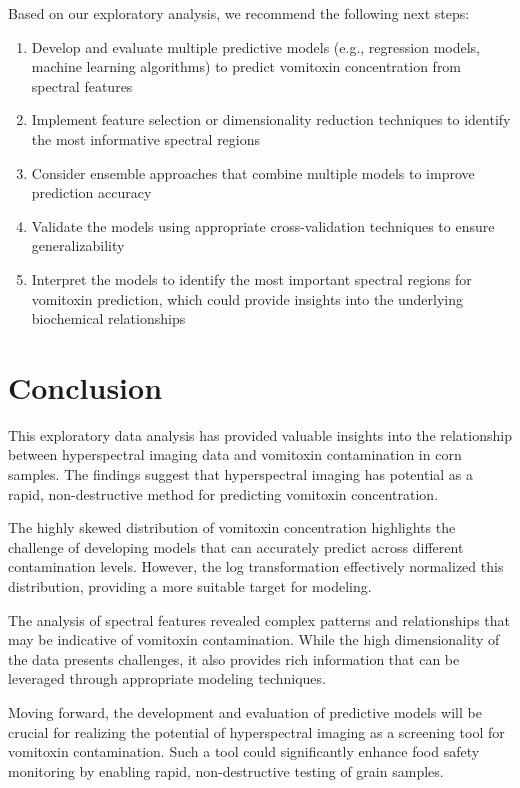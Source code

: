 \documentclass[12pt,a4paper]{article}
\begin{document}
Based on our exploratory analysis, we recommend the following next steps:

\begin{enumerate}
    \item Develop and evaluate multiple predictive models (e.g., regression models, machine learning algorithms) to predict vomitoxin concentration from spectral features
    \item Implement feature selection or dimensionality reduction techniques to identify the most informative spectral regions
    \item Consider ensemble approaches that combine multiple models to improve prediction accuracy
    \item Validate the models using appropriate cross-validation techniques to ensure generalizability
    \item Interpret the models to identify the most important spectral regions for vomitoxin prediction, which could provide insights into the underlying biochemical relationships
\end{enumerate}

\section{Conclusion}

This exploratory data analysis has provided valuable insights into the relationship between hyperspectral imaging data and vomitoxin contamination in corn samples. The findings suggest that hyperspectral imaging has potential as a rapid, non-destructive method for predicting vomitoxin concentration.

The highly skewed distribution of vomitoxin concentration highlights the challenge of developing models that can accurately predict across different contamination levels. However, the log transformation effectively normalized this distribution, providing a more suitable target for modeling.

The analysis of spectral features revealed complex patterns and relationships that may be indicative of vomitoxin contamination. While the high dimensionality of the data presents challenges, it also provides rich information that can be leveraged through appropriate modeling techniques.

Moving forward, the development and evaluation of predictive models will be crucial for realizing the potential of hyperspectral imaging as a screening tool for vomitoxin contamination. Such a tool could significantly enhance food safety monitoring by enabling rapid, non-destructive testing of grain samples.
\end{document}

